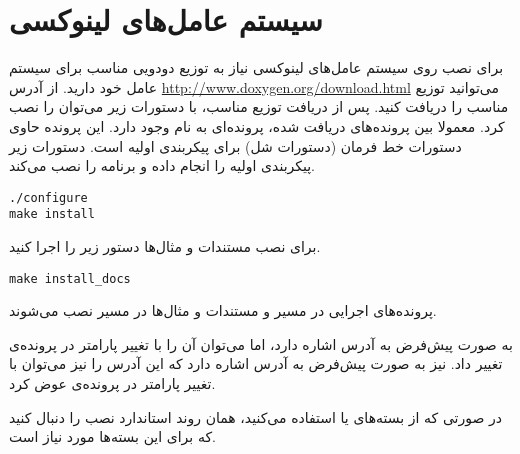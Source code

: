 \section{سیستم عامل‌های لینوکسی} 

\begin{sloppypar}
برای نصب  روی سیستم عامل‌های لینوکسی نیاز به توزیع دودویی مناسب برای سیستم عامل خود دارید. از آدرس 
\url{http://www.doxygen.org/download.html}
 می‌توانید توزیع مناسب را دریافت کنید. پس از دریافت توزیع مناسب، با دستورات زیر می‌توان  را نصب کرد. 
معمولا بین پرونده‌های دریافت شده، پرونده‌ای به نام  وجود دارد. این پرونده حاوی دستورات خط فرمان (دستورات شل) برای 
پیکربندی اولیه است. دستورات زیر پیکربندی اولیه را انجام داده و برنامه را نصب می‌کند.
\end{sloppypar}
\begin{latin}
\lstset{language=C++}  
\begin{lstlisting}[frame=single] 
./configure
make install
\end{lstlisting}
\end{latin}
برای نصب مستندات و مثال‌ها دستور زیر را اجرا کنید.
\begin{latin}
\lstset{language=C++}  
\begin{lstlisting}[frame=single] 
make install_docs
\end{lstlisting}
\end{latin}
پرونده‌های اجرایی در مسیر 
 و مستندات و مثال‌ها در مسیر 
  نصب می‌شوند.

\begin{sloppypar}
به صورت پیش‌فرض 
 به آدرس 
 اشاره دارد، اما می‌توان آن را با تغییر پارامتر 
 در پرونده‌ی  تغییر داد. 
 نیز به صورت پیش‌فرض به آدرس 
 اشاره دارد که این آدرس را نیز می‌توان با تغییر پارامتر 
 در پرونده‌ی  عوض کرد.
\end{sloppypar}

در صورتی که از بسته‌های  یا  استفاده می‌کنید، همان روند استاندارد 
نصب را دنبال کنید که برای این بسته‌ها مورد نیاز است.

